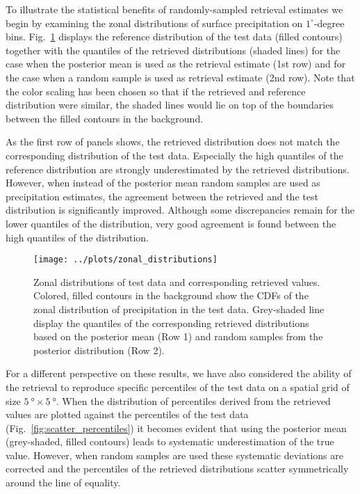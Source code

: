 \documentclass[a4paper,11pt,bibtotoc]{scrartcl}
\begin{document}
To illustrate the statistical benefits of randomly-sampled retrieval estimates
we begin by examining the zonal distributions of surface precipitation on
$1^\circ$-degree bins. Fig.~\ref{fig:results_zonal} displays the reference
distribution of the test data (filled contours) together with the quantiles of
the retrieved distributions (shaded lines) for the case when the posterior mean
is used as the retrieval estimate (1st row) and for the case when a random
sample is used as retrieval estimate (2nd row). Note that the color scaling
has been chosen so that if the retrieved and reference distribution were similar,
the shaded lines would lie on top of the boundaries between the filled contours
in the background.

As the first row of panels shows, the retrieved distribution does not match the
corresponding distribution of the test data. Especially the high quantiles of
the reference distribution are strongly underestimated by the retrieved
distributions. However, when instead of the posterior mean random samples are
used as precipitation estimates, the agreement between the retrieved and the
test distribution is significantly improved. Although some discrepancies remain
for the lower quantiles of the distribution, very good agreement is found between
the high quantiles of the distribution.

  \begin{figure}[hbpt]
    \centering
    \texttt{[image: ../plots/zonal\_distributions]}
    \caption{
      Zonal distributions of test data and corresponding retrieved values. Colored, filled contours
      in the background show the CDFs of the zonal distribution of precipitation in the test data.
      Grey-shaded line display the quantiles of the corresponding retrieved distributions based on
      the posterior mean (Row 1) and random samples from the posterior distribution (Row 2).
    }
    \label{fig:results_zonal}
  \end{figure}

  For a different perspective on these results, we have also considered the
  ability of the retrieval to reproduce specific percentiles of the test data on
  a spatial grid of size $\SI{5}{\degree}\times\SI{5}{\degree}$. When the
  distribution of percentiles derived from the retrieved values are plotted
  against the percentiles of the test data (Fig.\ \ref{fig:scatter_percentiles})
  it becomes evident that using the posterior mean (grey-shaded, filled
  contours) leads to systematic underestimation of the true value. However, when
  random samples are used these systematic deviations are corrected and the
  percentiles of the retrieved distributions scatter symmetrically around the
  line of equality.
\end{document}
